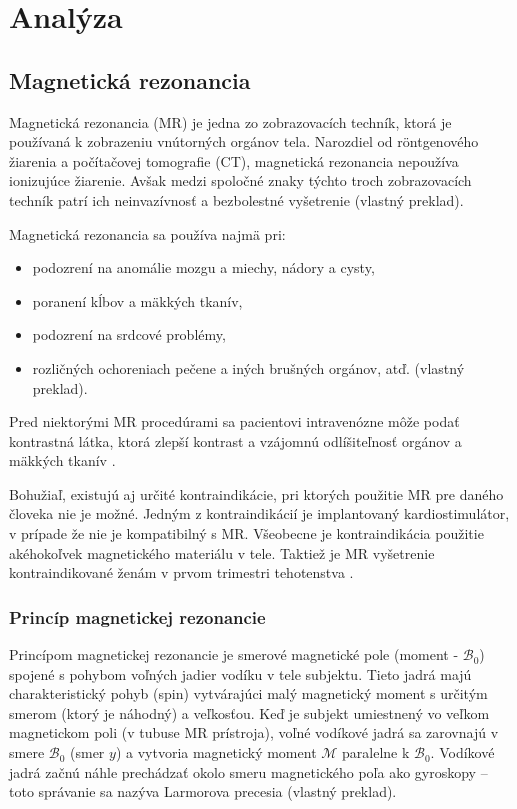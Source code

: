 \chapter {Analýza}

\section {Magnetická rezonancia}

Magnetická rezonancia (MR) je jedna zo zobrazovacích techník, ktorá je používaná k zobrazeniu vnútorných orgánov tela.
Narozdiel od röntgenového žiarenia a počítačovej tomografie (CT), magnetická rezonancia nepoužíva ionizujúce žiarenie. Avšak medzi spoločné znaky týchto troch zobrazovacích techník patrí ich neinvazívnosť a bezbolestné vyšetrenie \cite{basic_principles_of_mri} (vlastný preklad). \newline

Magnetická rezonancia sa používa najmä pri:
\begin {itemize}
\item {podozrení na anomálie mozgu a miechy, nádory a cysty,}
\item {poranení kĺbov a mäkkých tkanív,}
\item {podozrení na srdcové problémy,}
\item {rozličných ochoreniach pečene a iných brušných orgánov, atď. \cite{mr_usage} (vlastný preklad).}
\end {itemize}

Pred niektorými MR procedúrami sa pacientovi intravenózne môže podať kontrastná látka, ktorá zlepší kontrast a vzájomnú odlíšiteľnosť orgánov a mäkkých tkanív \cite{contrast_agents}.

Bohužiaľ, existujú aj určité kontraindikácie, pri ktorých použitie MR pre daného človeka nie je možné.
Jedným z kontraindikácií je implantovaný kardiostimulátor, v prípade že nie je kompatibilný s MR. Všeobecne je kontraindikácia použitie akéhokoľvek magnetického materiálu v tele. Taktiež je MR vyšetrenie kontraindikované ženám v prvom trimestri tehotenstva \cite{mr_contraindications}.

\subsection {Princíp magnetickej rezonancie}

Princípom magnetickej rezonancie je smerové magnetické pole (moment - $\mathcal{B}_{0}$) spojené s pohybom voľných jadier vodíku v tele subjektu. Tieto jadrá majú charakteristický pohyb (spin) vytvárajúci malý magnetický moment s určitým smerom (ktorý je náhodný) a veľkosťou. Keď je subjekt umiestnený vo veľkom magnetickom poli (v tubuse MR prístroja), voľné vodíkové jadrá sa zarovnajú v smere $\mathcal{B}_{0}$ (smer $y$) a vytvoria magnetický moment $\mathcal{M}$ paralelne k $\mathcal{B}_{0}$. Vodíkové jadrá začnú náhle prechádzať okolo smeru magnetického poľa ako gyroskopy -- toto správanie sa nazýva Larmorova precesia \cite{basic_principles_of_mri} (vlastný preklad).

